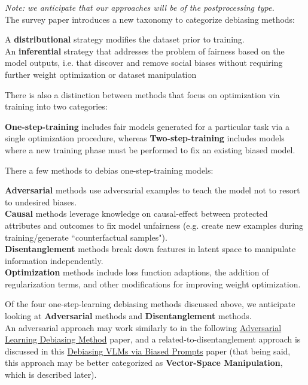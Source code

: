 \documentclass[12pt]{amsart}
\begin{document}
\textit{Note: we anticipate that our approaches will be of the postprocessing type.} \\

The survey paper introduces a new taxonomy to categorize debiasing methods: 

\begin{definition}
A \textbf{distributional} strategy modifies the dataset prior to training. \\

An \textbf{inferential} strategy that addresses the problem of fairness based on the model outputs, i.e. that discover and remove social biases without requiring further weight optimization or dataset manipulation
\end{definition}

There is also a distinction between methods that focus on optimization via training into two categories:
\begin{definition}
\textbf{One-step-training} includes fair models generated for a particular task via a single optimization procedure, whereas \textbf{Two-step-training} includes models where a new training phase must be performed to fix an existing biased model.
\end{definition}

There a few methods to debias one-step-training models:
\begin{definition}
\textbf{Adversarial} methods use adversarial examples to teach the model not to resort to undesired biases. \\

\textbf{Causal} methods leverage knowledge on causal-effect between protected attributes and outcomes to fix model unfairness (e.g. create new examples during training/generate ``counterfactual samples"). \\

\textbf{Disentanglement} methods break down features in latent space to manipulate information independently. \\

\textbf{Optimization} methods include loss function adaptions, the addition of regularization terms, and other modifications for improving weight optimization. 
\end{definition}

\begin{discussion*}
Of the four one-step-learning debiasing methods discussed above, we anticipate looking at \textbf{Adversarial} methods and \textbf{Disentanglement} methods. \\

An adversarial approach may work similarly to in the following \href{https://arxiv.org/pdf/2203.11933.pdf}{Adversarial Learning Debiasing Method} paper, and a related-to-disentanglement approach is discussed in this \href{https://arxiv.org/pdf/2302.00070.pdf}{Debiasing VLMs via Biased Prompts} paper (that being said, this approach may be better categorized as \textbf{Vector-Space Manipulation}, which is described later).
\end{discussion*}
\end{document}

